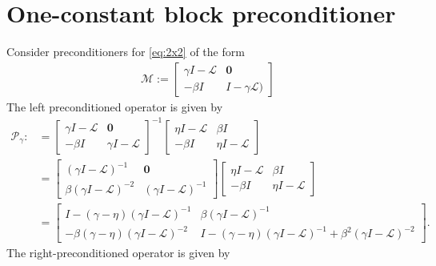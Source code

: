 \documentclass[a4paper,10pt]{article}
\begin{document}
\section{One-constant block preconditioner}

Consider preconditioners for \eqref{eq:2x2} of the form
%
\begin{align*}
\mathcal{M} := \begin{bmatrix} \gamma I - \mathcal{L} & \mathbf{0} \\
	-\beta I & I - \gamma\mathcal{L}) \end{bmatrix}
\end{align*}
%
The left preconditioned operator is given by
%
\begin{align*}
\mathcal{P}_\gamma :&= \begin{bmatrix} \gamma I - \mathcal{L} & \mathbf{0} \\
		-\beta I & \gamma I - \mathcal{L} \end{bmatrix}^{-1}
	\begin{bmatrix} \eta I - \mathcal{L} & \beta I \\
	-\beta I & \eta I - \mathcal{L} \end{bmatrix} \\
& = \begin{bmatrix} (\gamma I - \mathcal{L})^{-1} & \mathbf{0} \\
		\beta (\gamma I - \mathcal{L})^{-2} & (\gamma I - \mathcal{L})^{-1} \end{bmatrix}
	\begin{bmatrix} \eta I - \mathcal{L} & \beta I \\
	-\beta I & \eta I - \mathcal{L} \end{bmatrix} \\
& = \begin{bmatrix} I - (\gamma -\eta )(\gamma I - \mathcal{L})^{-1} & 
		\beta (\gamma I - \mathcal{L})^{-1} \\
		-\beta (\gamma -\eta )(\gamma I - \mathcal{L})^{-2} & 
		I - (\gamma -\eta )(\gamma I - \mathcal{L})^{-1} +
			\beta^2(\gamma I - \mathcal{L})^{-2}
	\end{bmatrix}.
\end{align*}
%
The right-preconditioned operator is given by
%
\end{document}
